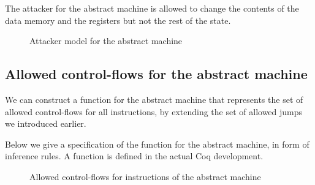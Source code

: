 The attacker for the abstract machine is allowed to change the
contents of the data memory and the registers but not the rest of the state.

\begin{figure}[ht]
\caption{Attacker model for the abstract machine}
\end{figure}

\subsection{Allowed control-flows for the abstract machine}
\label{sec:abstract_flow}

We can construct a function  for the abstract machine
that represents the set of allowed control-flows for all
instructions, by extending the set of allowed jumps \CFG we
introduced earlier.

Below we give a specification of the  function for the abstract machine,
in form of inference rules. A function is defined in the actual Coq development.

\begin{figure}[ht]
\bigskip

\bigskip

\bigskip

\caption{Allowed control-flows for instructions of the abstract machine}
\end{figure}

